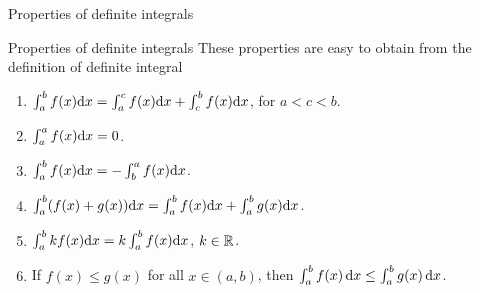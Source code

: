 \documentclass[9pt]{beamer}
\begin{document}
\begin{frame}{Properties of definite integrals}

    \begin{block}{Properties of definite integrals}
        These properties are easy to obtain from the definition of definite integral
        \begin{enumerate}[leftmargin = 0.5cm, label = $\bullet$, rightmargin = 0.2cm]
            \item $\int_a^bf(x)\mathrm{d} x = \int_a^c f(x)\mathrm{d} x + \int_c^bf(x)\mathrm{d} x$, for $a < c < b$.

            \item $\int_a^a f(x)\mathrm{d} x = 0$.

            \item $\int_a^b f(x)\mathrm{d} x = -\int_b^af(x)\mathrm{d} x$.

            \item $\int_a^b (f(x) + g(x))\mathrm{d} x = \int_a^b f(x)\mathrm{d} x + \int_a^b g(x)\mathrm{d} x$.

            \item $\int_a^b kf(x)\mathrm{d} x = k\int_a^b f(x)\mathrm{d} x$, $k\in\mathbb{R}$.

            \item If $f(x) \leq g(x)$ for all $x\in (a, b)$, then $\int_a^b f(x)\,\mathrm{d} x \leq \int_a^b g(x)\,\mathrm{d} x$.
        \end{enumerate}        
    \end{block}

\end{frame}
\end{document}

